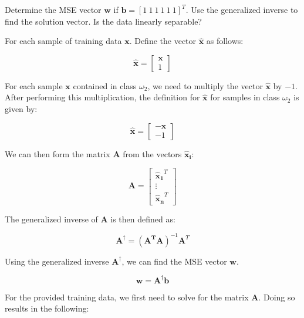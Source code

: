 \documentclass[fleqn]{article}
\begin{document}
\begin{enumerate}
		Determine the MSE vector $\mathbf{w}$ if $\mathbf{b} = [1\:1\:1\:1\:1\:1]^T$. Use the generalized inverse to find the solution vector. Is the data linearly separable?
		
		For each sample of training data $\mathbf{x}$. Define the vector $\mathbf{\hat{x}}$ as follows:
		
		\begin{equation*}
			\mathbf{\hat{x}} = \begin{bmatrix} \mathbf{x} \\ 1 \end{bmatrix}			
		\end{equation*}
		
		For each sample $\mathbf{x}$ contained in class $\omega_2$, we need to multiply the vector $\mathbf{\hat{x}}$ by $-1$. After performing this multiplication, the definition for $\mathbf{\hat{x}}$  for samples in class $\omega_2$ is given by:
		
		\begin{equation*}
			\mathbf{\hat{x}} = \begin{bmatrix} -\mathbf{x} \\ -1 \end{bmatrix}			
		\end{equation*}
		
		We can then form the matrix $\mathbf{A}$ from the vectors $\mathbf{\hat{x}_i}$:
		
		\begin{equation*}
			\mathbf{A} = \begin{bmatrix} \mathbf{\hat{x}_1}^T \\ \vdots \\ \mathbf{\hat{x}_n}^T \end{bmatrix}					
		\end{equation*}
		
		The generalized inverse of $\mathbf{A}$ is then defined as:
		
		\begin{equation*}
			\mathbf{A}^{\dag} = (\mathbf{A^T}\mathbf{A})^{-1}\mathbf{A}^T
		\end{equation*}
		
		Using the generalized inverse $\mathbf{A}^{\dag}$, we can find the MSE vector $\mathbf{w}$.
		
		\begin{equation*}
			\mathbf{w} = \mathbf{A}^{\dag}\mathbf{b}
		\end{equation*}
			
		For the provided training data, we first need to solve for the matrix $\mathbf{A}$. Doing so results in the following:
		

\end{enumerate}
\end{document}
